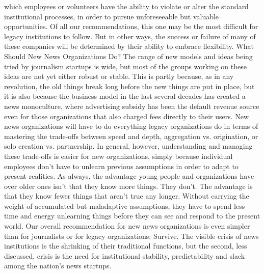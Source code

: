 which employees or volunteers have the ability to violate or alter the standard
institutional processes, in order to pursue unforeseeable but valuable opportunities.
Of all our recommendations, this one may be the most difficult for legacy
institutions to follow. But in other ways, the success or failure of many of these
companies will be determined by their ability to embrace flexibility.
What Should New News Organizations Do?
The range of new models and ideas being tried by journalism startups is wide,
but most of the groups working on these ideas are not yet either robust or stable.
This is partly because, as in any revolution, the old things break long before the
new things are put in place, but it is also because the business model in the last
several decades has created a news monoculture, where advertising subsidy has
been the default revenue source even for those organizations that also charged
fees directly to their users.
New news organizations will have to do everything legacy organizations do in
terms of mastering the trade-offs between speed and depth, aggregation vs. origination,
or solo creation vs. partnership. In general, however, understanding and
managing these trade-offs is easier for new organizations, simply because individual
employees don’t have to unlearn previous assumptions in order to adapt
to present realities. As always, the advantage young people and organizations have
over older ones isn’t that they know more things. They don’t. The advantage is that
they know fewer things that aren’t true any longer. Without carrying the weight
of accumulated but maladaptive assumptions, they have to spend less time and
energy unlearning things before they can see and respond to the present world.
Our overall recommendation for new news organizations is even simpler than
for journalists or for legacy organizations:
Survive.
The visible crisis of news institutions is the shrinking of their traditional functions,
but the second, less discussed, crisis is the need for institutional stability,
predictability and slack among the nation’s news startups.

